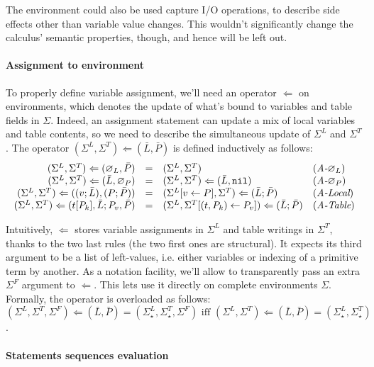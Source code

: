 The environment could also be used capture I/O operations, to describe
side effects other than variable value changes. This wouldn't
significantly change the calculus' semantic properties, though, and
hence will be left out.

\paragraph{Assignment to environment}
To properly define variable assignment, we'll need an operator
$\Leftarrow$ on environments, which denotes the update of what's bound
to variables and table fields in $\Sigma$. Indeed, an assignment
statement can update a mix of local variables and table contents, so
we need to describe the simultaneous update of $\Sigma^L$ and
$\Sigma^T$. The operator $(\Sigma^L, \Sigma^T) \Leftarrow (\bar L,
\bar P)$ is defined inductively as follows:
%
$$
\begin{array}{rcll}
%
(\Sigma^L,\Sigma^T) \Leftarrow (\varnothing_L,\bar P) &=& (\Sigma^L,\Sigma^T) &\eqlabel{A-$\varnothing_L$}\\ 
%
(\Sigma^L,\Sigma^T) \Leftarrow (\bar L,\varnothing_P)
&=&
(\Sigma^L,\Sigma^T) \Leftarrow (\bar L, \Nil)
&\eqlabel{A-$\varnothing_P$}\\
%
(\Sigma^L,\Sigma^T) \Leftarrow ((v;\bar L),(P;\bar P))
&=&
(\Sigma^L[v\leftarrow P], \Sigma^T) \Leftarrow (\bar L; \bar P)
&\eqlabel{A-Local}\\
%
(\Sigma^L,\Sigma^T) \Leftarrow (t[P_k], \bar L; P_v, \bar P)
&=&
(\Sigma^L,\Sigma^T[(t,P_k)\leftarrow P_v]) \Leftarrow (\bar L; \bar P)
&\eqlabel{A-Table}\\
%
\end{array}
$$

Intuitively, $\Leftarrow$ stores variable assignments in $\Sigma^L$
and table writings in $\Sigma^T$, thanks to the two last rules (the
two first ones are structural). It expects its third argument to be a
list of left-values, i.e. either variables or indexing of a primitive
term by another. As a notation facility, we'll allow to transparently
pass an extra $\Sigma^F$ argument to $\Leftarrow$. This lets use it
directly on complete environments $\Sigma$. Formally, the operator is
overloaded as follows:
%
$$(\Sigma^L,\Sigma^T,\Sigma^F) \Leftarrow (\bar L,\bar P) =
(\Sigma^L_\star,\Sigma^T_\star,\Sigma^F)
\textrm{ iff }
(\Sigma^L,\Sigma^T) \Leftarrow (\bar L, \bar P) =
(\Sigma^L_\star,\Sigma^T_\star)
$$.
%

\paragraph{Statements sequences evaluation}

